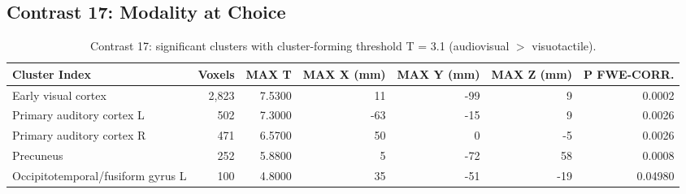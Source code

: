 \subsection{Contrast 17: Modality at Choice}

\begin{table}[htbp]
    \centering
    \begin{threeparttable}
    \caption{Contrast 17: significant clusters with cluster-forming threshold T = 3.1 (audiovisual $>$ visuotactile).}
    \begin{tabularx}{\textwidth}{l *{6}{R}}
        \toprule
        \textbf{Cluster Index} & \textbf{Voxels} & \textbf{MAX T} & \textbf{MAX X (mm)} & \textbf{MAX Y (mm)} & \textbf{MAX Z (mm)} & \textbf{P FWE-CORR.} \\
        \midrule
        Early visual cortex & 2,823 & 7.5300 & 11 & -99 & 9 & 0.0002 \\ %
        Primary auditory cortex L & 502 & 7.3000 & -63 & -15 & 9 & 0.0026 \\ %
        Primary auditory cortex R & 471 & 6.5700 & 50 & 0 & -5 & 0.0026 \\ %
        Precuneus & 252 & 5.8800 & 5 & -72 & 58 & 0.0008 \\
        Occipitotemporal/fusiform gyrus L & 100 & 4.8000 & 35 & -51 & -19 & 0.04980 \\
        \bottomrule
    \end{tabularx}
    \end{threeparttable}
    \label{tab:con17_pos}%
\end{table}%

